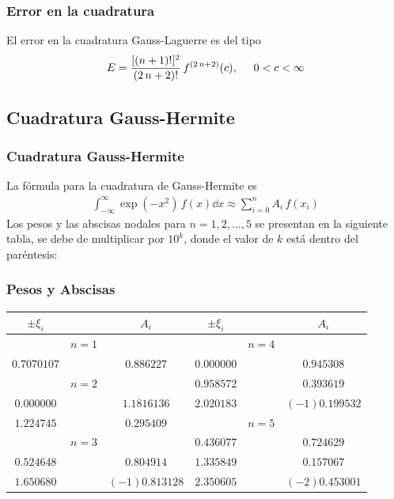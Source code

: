 \begin{frame}
\frametitle{Error en la cuadratura}
El error en la cuadratura Gauss-Laguerre es del tipo
\begin{align*}
E = \dfrac{[(n + 1)!]^{2}}{(2 \, n + 2)!} \, f^{(2 \, n + 2)} (c), \hspace{0.5cm} 0 < c < \infty
\end{align*}
\end{frame}
\subsection*{Cuadratura Gauss-Hermite}
\begin{frame}
\frametitle{Cuadratura Gauss-Hermite}
La fórmula para la cuadratura de Gauss-Hermite es
\begin{align*}
\int_{-\infty}^{\infty} \exp(-x^{2}) \, f(x) \dd{x} \approx \sum_{i=0}^{n} A_{i} \, f(x_{i})
\end{align*}
Los pesos y las abscisas nodales para $n = 1, 2, \ldots, 5$ se presentan en la siguiente tabla, se debe de multiplicar por $10^{k}$, donde el valor de $k$ está dentro del paréntesis:
\end{frame}
\begin{frame}
\frametitle{Pesos y Abscisas}
\fontsize{10}{10}\selectfont
\begin{center}
\begin{tabular}{|c c c | c c c|}
\hline
$\pm \xi_{i}$ & & $A_{i}$ & $\pm \xi_{i}$ &  & $A_{i}$ \\ \hline
 & $n=1$ & & & $n=4$ & \\ %
$0.7070107$ & & $0.886227$ & $0.000000$ & & $0.945308$ \\ %
 & $n=2$ & & $0.958572$ & & $0.393619$ \\ %
$0.000000$ & & $1.1816136$ & $2.020183$ & & $(-1)0.199532$ \\ %
$1.224745$ & & $0.295409$ & & $n=5$ & \\ %
 & $n=3$ & & $0.436077$ & & $0.724629$ \\ %
$0.524648$ & & $0.804914$ & $1.335849$ & & $0.157067$ \\ %
$1.650680$ & & $(-1)0.813128$ & $2.350605$ & & $(-2)0.453001$ \\ \hline
\end{tabular}
\end{center}
\end{frame}
